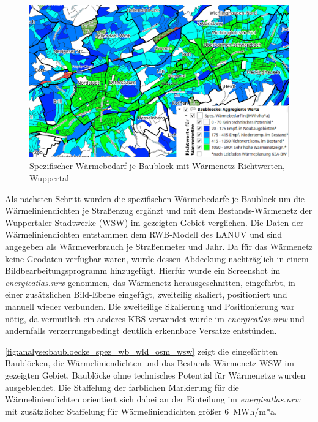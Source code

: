 		\begin{figure}[h]
			\centering
			\includegraphics[width=\linewidth]{./Medien/own/baubloecke/baubloecke_spez_wb.png}
			\caption{Spezifischer Wärmebedarf je Baublock mit Wärmenetz-Richtwerten, Wuppertal}
			\label{fig:analyse:baubloecke_spez_wb}
		\end{figure}
		
		Als nächsten Schritt wurden die spezifischen Wärmebedarfe je Baublock um die Wärmeliniendichten je Straßenzug ergänzt und mit dem Bestands-Wärmenetz der Wuppertaler Stadtwerke (WSW) im gezeigten Gebiet verglichen. Die Daten der Wärmeliniendichten entstammen dem RWB-Modell des LANUV und sind angegeben als Wärmeverbrauch je Straßenmeter und Jahr. Da für das Wärmenetz keine Geodaten verfügbar waren, wurde dessen Abdeckung nachträglich in einem Bildbearbeitungsprogramm hinzugefügt. Hierfür wurde ein Screenshot im \textit{energieatlas.nrw} genommen, das Wärmenetz herausgeschnitten, eingefärbt, in einer zusätzlichen Bild-Ebene eingefügt, zweiteilig skaliert, positioniert und manuell wieder verbunden. Die zweiteilige Skalierung und Positionierung war nötig, da vermutlich ein anderes KBS verwendet wurde im \textit{energieatlas.nrw} und andernfalls verzerrungsbedingt deutlich erkennbare Versatze entstünden. 
		
		\autoref{fig:analyse:baubloecke_spez_wb_wld_osm_wsw} zeigt die eingefärbten Baublöcken, die Wärmeliniendichten und das Bestands-Wärmenetz WSW im gezeigten Gebiet. Baublöcke ohne technisches Potential für Wärmenetze wurden ausgeblendet. Die Staffelung der farblichen Markierung für die Wärmeliniendichten orientiert sich dabei an der Einteilung im \textit{energieatlas.nrw} mit zusätzlicher Staffelung für Wärmeliniendichten größer 6~MWh/m*a. 
		

